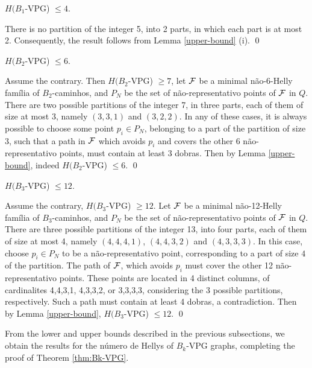 \begin{lema}\label{claim:upper-B1-VPG}
$H(B_1$-VPG) $\leq  4$.
\end{lema}

\proof There is no partition of the integer 5, into 2 parts, in which each part is at most 2. Consequently, the result follows from Lemma \ref{upper-bound} (i). \qed

\begin{lema}\label{claim:upper-B2-VPG}
$H(B_2$-VPG)  $\leq  6$.
\end{lema}

\proof Assume the contrary. Then $H(B_2$-VPG) $\geq  7$, let $\cal F$ be a minimal não-6-Helly família of $B_2$-caminhos, and  $P_N$ be the set of não-representativo points of $\cal F$ in $Q$. There are two possible partitions of the integer 7, in three parts, each of them of size at most 3, namely $(3,3,1)$ and $(3,2,2)$. In any of these cases,  it is always possible to choose some point  $p_i \in P_N$, belonging  to a part of the partition of size 3, such that a path in $\cal F$  which  avoids $p_i$ and covers the other 6 não-representativo points, must contain at least 3 dobras.  Then by Lemma \ref{upper-bound}, indeed $H(B_2$-VPG)  $\leq  6$. \qed


\begin{lema}\label{claim:upper-B3-VPG}
$H(B_3$-VPG) $\leq  12$.
\end{lema}

\proof Assume the contrary, $H(B_3$-VPG) $\geq  12$. Let $\cal F$ be a minimal não-12-Helly família of $B_3$-caminhos, and  $P_N$ be the set of não-representativo points of $\cal F$ in $Q$. There are three possible partitions of the integer 13, into four parts, each of them of size at most 4, namely $(4,4,4,1)$, $(4,4,3,2)$ and $(4,3,3,3)$. In this case, choose $p_i \in P_N$ to be a não-representativo point, corresponding to a part of size $4$ of the partition.  The path of ${\cal F}$, which avoids $p_i$ must cover the other 12 não-representativo points. These points are located in 4 distinct columns, of cardinalites 4,4,3,1, 4,3,3,2, or 3,3,3,3, considering the 3 possible partitions, respectively. Such a path must contain at least 4 dobras, a contradiction. Then by Lemma \ref{upper-bound}, $H(B_3$-VPG) $\leq  12$.    \qed  

From the lower and upper bounds described in the previous subsections, we obtain the results for the número de Hellys of $B_k$-VPG graphs, completing the proof of Theorem \ref{thm:Bk-VPG}.

